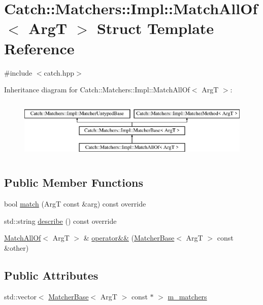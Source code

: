 \hypertarget{struct_catch_1_1_matchers_1_1_impl_1_1_match_all_of}{}\section{Catch\+:\+:Matchers\+:\+:Impl\+:\+:Match\+All\+Of$<$ ArgT $>$ Struct Template Reference}
\label{struct_catch_1_1_matchers_1_1_impl_1_1_match_all_of}


{\ttfamily \#include $<$catch.\+hpp$>$}

Inheritance diagram for Catch\+:\+:Matchers\+:\+:Impl\+:\+:Match\+All\+Of$<$ ArgT $>$\+:\begin{figure}[H]
\begin{center}
\leavevmode
\includegraphics[height=2.926829cm]{struct_catch_1_1_matchers_1_1_impl_1_1_match_all_of}
\end{center}
\end{figure}
\subsection*{Public Member Functions}
\begin{DoxyCompactItemize}
\item 
bool \mbox{\hyperlink{struct_catch_1_1_matchers_1_1_impl_1_1_match_all_of_acfb377bda2c58ae62e6df9c3a8a89f8f}{match}} (ArgT const \&arg) const override
\item 
std\+::string \mbox{\hyperlink{struct_catch_1_1_matchers_1_1_impl_1_1_match_all_of_acbb9a083e93b546fd33c9235b644c40f}{describe}} () const override
\item 
\mbox{\hyperlink{struct_catch_1_1_matchers_1_1_impl_1_1_match_all_of}{Match\+All\+Of}}$<$ ArgT $>$ \& \mbox{\hyperlink{struct_catch_1_1_matchers_1_1_impl_1_1_match_all_of_a9d0e38b36474336498d627610db434f3}{operator\&\&}} (\mbox{\hyperlink{struct_catch_1_1_matchers_1_1_impl_1_1_matcher_base}{Matcher\+Base}}$<$ ArgT $>$ const \&other)
\end{DoxyCompactItemize}
\subsection*{Public Attributes}
\begin{DoxyCompactItemize}
\item 
std\+::vector$<$ \mbox{\hyperlink{struct_catch_1_1_matchers_1_1_impl_1_1_matcher_base}{Matcher\+Base}}$<$ ArgT $>$ const  $\ast$ $>$ \mbox{\hyperlink{struct_catch_1_1_matchers_1_1_impl_1_1_match_all_of_a98d6a2611f195a4a5c49f92fd877be9a}{m\+\_\+matchers}}
\end{DoxyCompactItemize}
